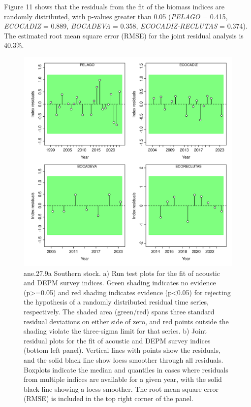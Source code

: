 \documentclass[
]{article}
\begin{document}
Figure 11 shows that the residuals from the fit of the biomass indices
are randomly distributed, with p-values greater than 0.05 (\emph{PELAGO}
= 0.415, \emph{ECOCADIZ} = 0.889, \emph{BOCADEVA} = 0.358,
\emph{ECOCADIZ-RECLUTAS} = 0.374). The estimated root mean square error
(RMSE) for the joint residual analysis is 40.3\%.

\begin{figure}[H]

{\centering \includegraphics[width=0.95\linewidth]{report/run/S1.0_4FLEETS_SelECO_RecIndex_Mnewfix/fig_runtest_residuals_indices} 

}

\caption{ane.27.9a Southern stock. a) Run test plots for the fit of acoustic and DEPM survey indices. Green shading indicates no evidence (p>=0.05) and red shading indicates evidence (p<0.05) for rejecting the hypothesis of a randomly distributed residual time series, respectively. The shaded area (green/red) spans three standard residual deviations on either side of zero, and red points outside the shading violate the three-sigma limit for that series. b) Joint residual plots for the fit of acoustic and DEPM survey indices (bottom left panel).  Vertical lines with points show the residuals, and the solid black line show loess smoother through all residuals. Boxplots indicate the median and quantiles in cases where residuals from multiple indices are available for a given year, with the solid black line showing a loess smoother. The root mean square error (RMSE) is included in the top right corner of the panel.}\label{fig:unnamed-chunk-15}
\end{figure}
\end{document}
